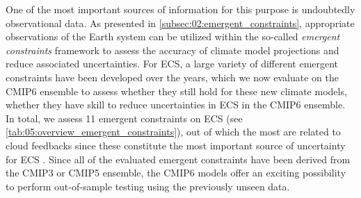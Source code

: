 One of the most important sources of information for this purpose is
undoubtedly observational data. As presented in
\cref{subsec:02:emergent_constraints}, appropriate observations of the Earth
system can be utilized within the so-called \emph{emergent constraints}
framework to assess the accuracy of climate model projections and reduce
associated uncertainties. For \ac{ECS}, a large variety of different emergent
constraints have been developed over the years, which we now evaluate on the
\acs{CMIP}6 ensemble to assess whether they still hold for these new climate
models, \ie{} whether they have skill to reduce uncertainties in \ac{ECS} in
the \acs{CMIP}6 ensemble. In total, we assess 11 emergent constraints on
\ac{ECS} (see \cref{tab:05:overview_emergent_constraints}), out of which the
most are related to cloud feedbacks since these constitute the most important
source of uncertainty for \ac{ECS} . Since all of the evaluated emergent
constraints have been derived from the \acs{CMIP}3 or \acs{CMIP}5 ensemble, the
\acs{CMIP}6 models offer an exciting possibility to perform out-of-sample
testing using the previously unseen data.

